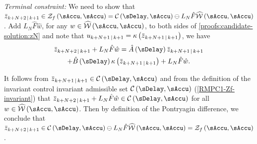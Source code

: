 \noindent\textit{Terminal constraint:}
%
We need to show that $\Nom z_{k+N+2\Given k+1}\in\ZSet_{f}\left(\sAccu,\sAccu\right)=\CCC\left(\sDelay,\sAccu\right)\ominus L_{N}\hat{F}\WhSet\left(\sAccu,\sAccu\right)$.
Add $L_{N}\hat{F}\hat{w}$, for any $w\in\WhSet\left(\sAccu,\sAccu\right)$,
to both sides of \eqref{proofs:candidate-solution:zN} and note that
$u_{k+N+1\Given k+1}=\kappa\left(\Nom z_{k+N+1\Given k+1}\right)$,
we have 
\begin{multline*}
  \Nom z_{k+N+2\Given
    k+1}+L_{N}\hat{F}\hat{w}=\hat{A}\left(\sDelay\right)\Nom
  z_{k+N+1\Given k+1} \\
  +\hat{B}\left(\sDelay\right)\kappa\left(\Nom
    z_{k+N+1\Given k+1}\right)+L_{N}\hat{F}\hat{w}\text{.}
\end{multline*}


 It follows from $\Nom z_{k+N+1\Given k+1}\in\CCC\left(\sDelay,\sAccu\right)$
and from the definition of the invariant control invariant admissible
set $\CCC\left(\sDelay,\sAccu\right)$ (\eqref{RMPC1-Zf-invariant})
that $\Nom z_{k+N+2\Given k+1}+L_{N}\hat{F}\hat{w}\in\CCC\left(\sDelay,\sAccu\right)$
for all $w\in\WhSet\left(\sAccu,\sAccu\right)$. Then by definition
of the Pontryagin difference, we conclude that $\Nom z_{k+N+2\Given k+1}\in\CCC\left(\sDelay,\sAccu\right)\ominus L_{N}\hat{F}\WhSet\left(\sAccu,\sAccu\right)=\ZSet_{f}\left(\sAccu,\sAccu\right)$.


